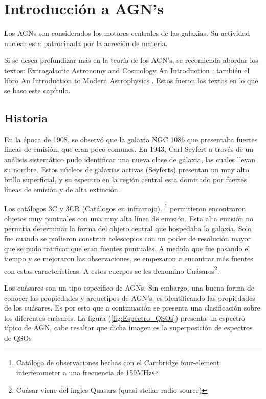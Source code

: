 \section{Introducción a AGN's}
\label{sec:Introduction_AGN's}

Los AGNs son considerados los motores centrales de las galaxias. Su  actividad nuclear esta patrocinada por la acreción de materia. 

Si se desea profundizar más en la teoría de los AGN's, se recomienda abordar los textos: Extragalactic Astronomy and Cosmology An Introduction  \cite{schneider2006};  también el libro An Introduction to Modern Astrophysics \cite{carroll2007}. Estos fueron los textos en lo que se baso este capítulo. 


	\subsection{Historia}
	\label{subsec:History}
	
En la época de 1908, se observó que la galaxia NGC 1086 que presentaba fuertes lineas de emisión, que eran poco comunes. En 1943, Carl Seyfert a través de un análisis sistemático pudo identificar una nueva clase de galaxia, las cuales llevan su nombre. Estos núcleos de galaxias activas (Seyferts) presentan un muy alto brillo superficial, y su espectro en la región central esta dominado por fuertes líneas de emisión y de alta extinción.  

Los catálogos 3C y 3CR (Catálogos en infrarrojo). \footnote{Catálogo de observaciones hechas con el Cambridge four-element interferometer a una frecuencia de 159MHz} permitieron encontraron objetos muy puntuales con una muy alta línea de emisión. Esta alta emisión no permitía determinar la forma del objeto central que hospedaba la galaxia. Solo fue cuando se pudieron construir telescopios con un poder de resolución mayor que se pudo ratificar que eran fuentes puntuales. A medida que fue pasando el tiempo y se mejoraron  las observaciones, se empezaron a encontrar más fuentes con estas características. A estos cuerpos se les denomino  Cuásares\footnote{Cuásar viene del ingles Quasars (quasi-stellar radio source)}.

Los cuásares son un tipo específico de AGNs. Sin embargo, una buena forma de conocer las propiedades y arquetipos de  AGN's, es identificando las propiedades de los cuásares. Es por esto que a continuación se presenta una clasificación sobre los diferentes cuásares.  La figura (\ref{fig:Espectro_QSOs}) presenta un espectro típico de AGN, cabe resaltar que dicha imagen es la superposición de espectros de QSOs



